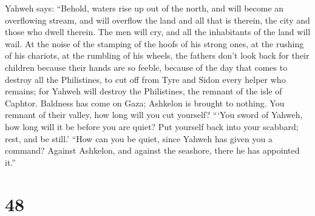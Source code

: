  Yahweh says: ``Behold, waters rise up out of the north, and
will become an overflowing stream, and will overflow the land and all
that is therein, the city and those who dwell therein. The men will cry,
and all the inhabitants of the land will wail.  At the noise
of the stamping of the hoofs of his strong ones, at the rushing of his
chariots, at the rumbling of his wheels, the fathers don't look back for
their children because their hands are so feeble,  because
of the day that comes to destroy all the Philistines, to cut off from
Tyre and Sidon every helper who remains; for Yahweh will destroy the
Philistines, the remnant of the isle of Caphtor.  Baldness
has come on Gaza; Ashkelon is brought to nothing. You remnant of their
valley, how long will you cut yourself?  ```You sword of
Yahweh, how long will it be before you are quiet? Put yourself back into
your scabbard; rest, and be still.'  ``How can you be quiet,
since Yahweh has given you a command? Against Ashkelon, and against the
seashore, there he has appointed it.''

\hypertarget{section-47}{%
\section{48}\label{section-47}}

